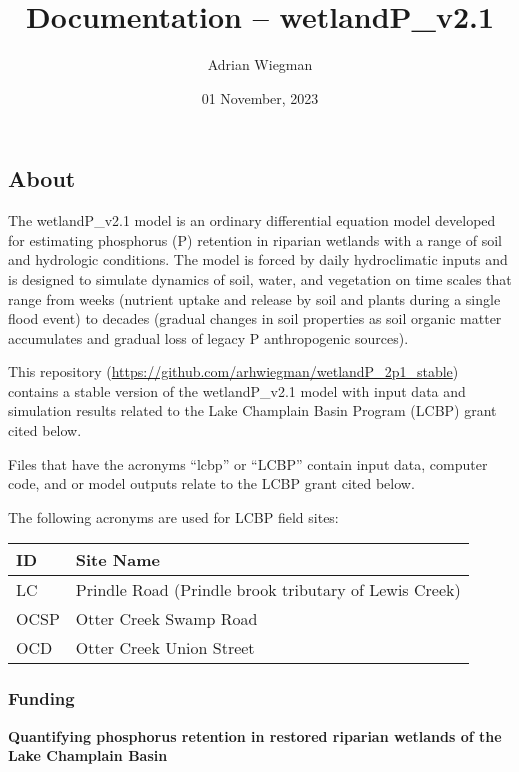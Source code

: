 \documentclass[
]{article}
\title{Documentation -- wetlandP\_v2.1}
\author{Adrian Wiegman}
\date{01 November, 2023}
\begin{document}
\maketitle

{
\setcounter{tocdepth}{2}
\tableofcontents
}
\hypertarget{about}{%
\subsection{About}\label{about}}

The wetlandP\_v2.1 model is an ordinary differential equation model
developed for estimating phosphorus (P) retention in riparian wetlands
with a range of soil and hydrologic conditions. The model is forced by
daily hydroclimatic inputs and is designed to simulate dynamics of soil,
water, and vegetation on time scales that range from weeks (nutrient
uptake and release by soil and plants during a single flood event) to
decades (gradual changes in soil properties as soil organic matter
accumulates and gradual loss of legacy P anthropogenic sources).

This repository
(\url{https://github.com/arhwiegman/wetlandP_2p1_stable}) contains a
stable version of the wetlandP\_v2.1 model with input data and
simulation results related to the Lake Champlain Basin Program (LCBP)
grant cited below.

Files that have the acronyms ``lcbp'' or ``LCBP'' contain input data,
computer code, and or model outputs relate to the LCBP grant cited
below.

The following acronyms are used for LCBP field sites:

\begin{longtable}[]{@{}ll@{}}
\toprule\noalign{}
ID & Site Name \\
\midrule\noalign{}
\endhead
\bottomrule\noalign{}
\endlastfoot
LC & Prindle Road (Prindle brook tributary of Lewis Creek) \\
OCSP & Otter Creek Swamp Road \\
OCD & Otter Creek Union Street \\
\end{longtable}

\hypertarget{funding}{%
\subsubsection{Funding}\label{funding}}

\textbf{Quantifying phosphorus retention in restored riparian wetlands
of the Lake Champlain Basin}
\end{document}
